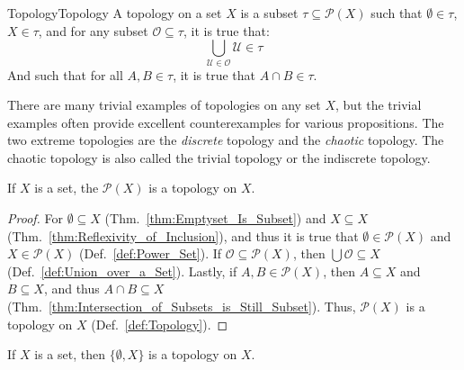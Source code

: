     \begin{fdefinition}{Topology}{Topology}
        A \gls{topology} on a \gls{set} $X$ is a \gls{subset}
        $\tau\subseteq\mathcal{P}(X)$ such that $\emptyset\in\tau$, $X\in\tau$,
        and for any subset $\mathcal{O}\subseteq\tau$, it is true that:
        \begin{equation*}
            \bigcup_{\mathcal{U}\in\mathcal{O}}\mathcal{U}\in\tau
        \end{equation*}
        And such that for all $A,B\in\tau$, it is true that $A\cap{B}\in\tau$.
    \end{fdefinition}
    There are many trivial examples of topologies on any set $X$, but the
    trivial examples often provide excellent counterexamples for various
    propositions. The two extreme topologies are the \textit{discrete} topology
    and the \textit{chaotic} topology. The chaotic topology is also called the
    trivial topology or the indiscrete topology.%
    \begin{theorem}
        \label{thm:discrete_topology_is_a_topology}%
        If $X$ is a set, the $\mathcal{P}(X)$ is a topology on $X$.
    \end{theorem}
    \begin{proof}
        For $\emptyset\subseteq{X}$ (Thm.~\ref{thm:Emptyset_Is_Subset}) and
        $X\subseteq{X}$ (Thm.~\ref{thm:Reflexivity_of_Inclusion}), and thus it
        is true that $\emptyset\in\mathcal{P}(X)$ and $X\in\mathcal{P}(X)$
        (Def.~\ref{def:Power_Set}). If $\mathcal{O}\subseteq\mathcal{P}(X)$,
        then $\bigcup\mathcal{O}\subseteq{X}$ (Def.~\ref{def:Union_over_a_Set}).
        Lastly, if $A,B\in\mathcal{P}(X)$, then $A\subseteq{X}$ and
        $B\subseteq{X}$, and thus $A\cap{B}\subseteq{X}$
        (Thm.~\ref{thm:Intersection_of_Subsets_is_Still_Subset}). Thus,
        $\mathcal{P}(X)$ is a topology on $X$ (Def.~\ref{def:Topology}).
    \end{proof}
    \begin{theorem}
        \label{thm:chaotic_topology_is_topology}%
        If $X$ is a set, then $\{\emptyset,X\}$ is a topology on $X$.
    \end{theorem}

